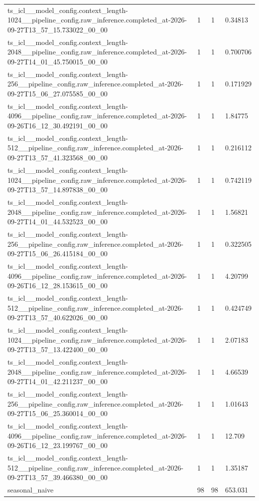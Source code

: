 \begin{tabular}{llll}
ts\_icl\_\_model\_config.context\_length-1024\_\_pipeline\_config.raw\_inference.completed\_at-2026-09-27T13\_57\_15.733022\_00\_00 & 1 & 1 & 0.34813 \\
ts\_icl\_\_model\_config.context\_length-2048\_\_pipeline\_config.raw\_inference.completed\_at-2026-09-27T14\_01\_45.750015\_00\_00 & 1 & 1 & 0.700706 \\
ts\_icl\_\_model\_config.context\_length-256\_\_pipeline\_config.raw\_inference.completed\_at-2026-09-27T15\_06\_27.075585\_00\_00 & 1 & 1 & 0.171929 \\
ts\_icl\_\_model\_config.context\_length-4096\_\_pipeline\_config.raw\_inference.completed\_at-2026-09-26T16\_12\_30.492191\_00\_00 & 1 & 1 & 1.84775 \\
ts\_icl\_\_model\_config.context\_length-512\_\_pipeline\_config.raw\_inference.completed\_at-2026-09-27T13\_57\_41.323568\_00\_00 & 1 & 1 & 0.216112 \\
ts\_icl\_\_model\_config.context\_length-1024\_\_pipeline\_config.raw\_inference.completed\_at-2026-09-27T13\_57\_14.897838\_00\_00 & 1 & 1 & 0.742119 \\
ts\_icl\_\_model\_config.context\_length-2048\_\_pipeline\_config.raw\_inference.completed\_at-2026-09-27T14\_01\_44.532523\_00\_00 & 1 & 1 & 1.56821 \\
ts\_icl\_\_model\_config.context\_length-256\_\_pipeline\_config.raw\_inference.completed\_at-2026-09-27T15\_06\_26.415184\_00\_00 & 1 & 1 & 0.322505 \\
ts\_icl\_\_model\_config.context\_length-4096\_\_pipeline\_config.raw\_inference.completed\_at-2026-09-26T16\_12\_28.153615\_00\_00 & 1 & 1 & 4.20799 \\
ts\_icl\_\_model\_config.context\_length-512\_\_pipeline\_config.raw\_inference.completed\_at-2026-09-27T13\_57\_40.622026\_00\_00 & 1 & 1 & 0.424749 \\
ts\_icl\_\_model\_config.context\_length-1024\_\_pipeline\_config.raw\_inference.completed\_at-2026-09-27T13\_57\_13.422400\_00\_00 & 1 & 1 & 2.07183 \\
ts\_icl\_\_model\_config.context\_length-2048\_\_pipeline\_config.raw\_inference.completed\_at-2026-09-27T14\_01\_42.211237\_00\_00 & 1 & 1 & 4.66539 \\
ts\_icl\_\_model\_config.context\_length-256\_\_pipeline\_config.raw\_inference.completed\_at-2026-09-27T15\_06\_25.360014\_00\_00 & 1 & 1 & 1.01643 \\
ts\_icl\_\_model\_config.context\_length-4096\_\_pipeline\_config.raw\_inference.completed\_at-2026-09-26T16\_12\_23.199767\_00\_00 & 1 & 1 & 12.709 \\
ts\_icl\_\_model\_config.context\_length-512\_\_pipeline\_config.raw\_inference.completed\_at-2026-09-27T13\_57\_39.466380\_00\_00 & 1 & 1 & 1.35187 \\
seasonal\_naive & 98 & 98 & 653.031 \\
\bottomrule
\end{tabular}
